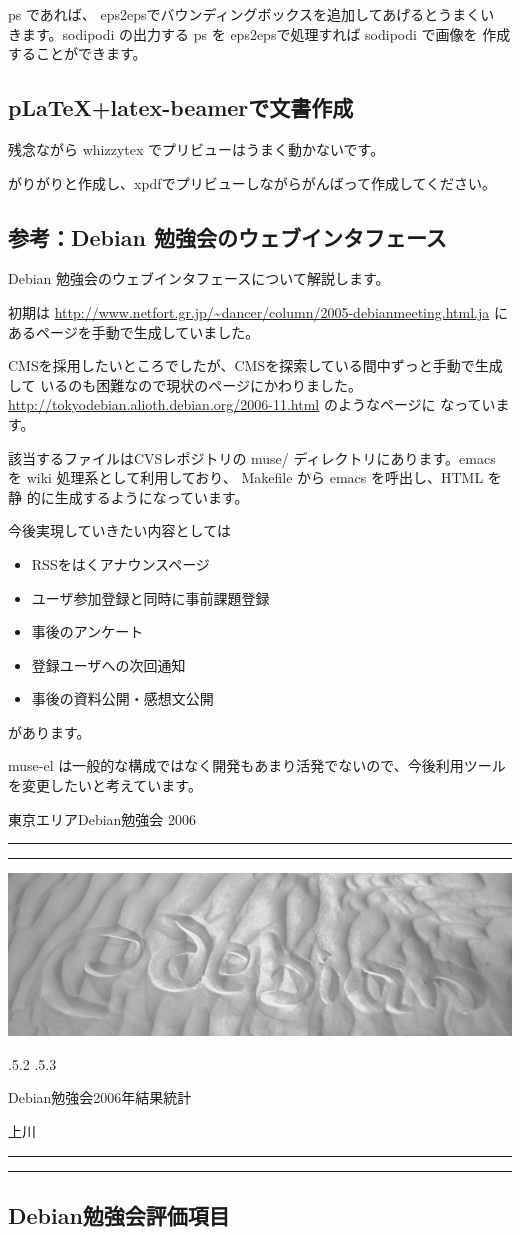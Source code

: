 \documentclass[mingoth,a4paper]{jsarticle}
\makeatletter
\renewcommand{\section}{\@startsection{section}{1}{\z@}%
    {\Cvs \@plus.5\Cdp \@minus.2\Cdp}%
    {.5\Cvs \@plus.3\Cdp}%
    {\normalfont\Huge\headfont\raggedright\centering}} %
\newcommand{\dancersection}[2]{%
\newpage
東京エリアDebian勉強会 2006
\hrule
\vspace{0.5mm}
\hrule
\hfill{}\includegraphics[width=16cm]{image2006-natsu/guruguru-sand-light.png}\\
\vspace{-5cm}
\begin{center}
\section{#1}
\end{center}
\hfill{}\colorbox{white}{#2}\hspace{3cm}\space\\
\vspace{1cm}
\hrule
\vspace{0.5mm}
\hrule
\vspace{1cm}
}
\makeatother
\begin{document}
ps であれば、 eps2epsでバウンディングボックスを追加してあげるとうまくい
きます。sodipodi の出力する ps を eps2epsで処理すれば sodipodi で画像を
作成することができます。

\subsection{pLaTeX+latex-beamerで文書作成}

残念ながら whizzytex でプリビューはうまく動かないです。

がりがりと作成し、xpdfでプリビューしながらがんばって作成してください。


\subsection*{参考：Debian 勉強会のウェブインタフェース}

Debian 勉強会のウェブインタフェースについて解説します。

初期は
\url{http://www.netfort.gr.jp/~dancer/column/2005-debianmeeting.html.ja} 
にあるページを手動で生成していました。

CMSを採用したいところでしたが、CMSを探索している間中ずっと手動で生成して
いるのも困難なので現状のページにかわりました。
\url{http://tokyodebian.alioth.debian.org/2006-11.html} のようなページに
なっています。

該当するファイルはCVSレポジトリの muse/ ディレクトリにあります。emacs を 
wiki 処理系として利用しており、 Makefile から emacs を呼出し、HTML を静
的に生成するようになっています。

今後実現していきたい内容としては
\begin{itemize}
 \item RSSをはくアナウンスページ
 \item ユーザ参加登録と同時に事前課題登録
 \item 事後のアンケート
 \item 登録ユーザへの次回通知
 \item 事後の資料公開・感想文公開
\end{itemize}

があります。

muse-el は一般的な構成ではなく開発もあまり活発でないので、今後利用ツール
を変更したいと考えています。

\dancersection{Debian勉強会2006年結果統計}{上川}
\label{sec:debmtg2006}

\subsection{Debian勉強会評価項目}
\end{document}
